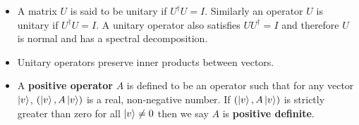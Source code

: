 \documentclass{article}
\begin{document}
\begin{itemize}
  \item A matrix $U$ is said to be unitary if $U^\dag U = I$. Similarly an operator $U$ is unitary if $U^\dag U = I$. A unitary operator also satisfies $U U^\dag = I$ and therefore $U$ is normal and has a spectral decomposition.

  \item Unitary operators preserve inner products between vectors.

  \item A \textbf{positive operator} $A$ is defined to be an operator such that for any vector $\ket{v}$, $(\ket{v}, A \ket{v})$ is a real, non-negative number. If $(\ket{v}, A \ket{v})$ is strictly greater than zero for all $\ket{v} \ne 0$ then we say $A$ is \textbf{positive definite}.
\end{itemize}
\end{document}
